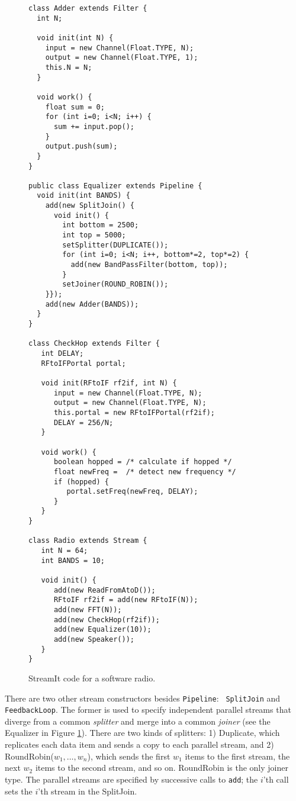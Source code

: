 \documentclass{sig-alternate}
\begin{document}
\begin{figure}
\vspace{-6pt}
\caption{Block diagram of a software radio.
\protect\label{fig:radiodiagram}}

\scriptsize
\begin{verbatim}
class Adder extends Filter {
  int N;

  void init(int N) {
    input = new Channel(Float.TYPE, N);
    output = new Channel(Float.TYPE, 1);
    this.N = N;
  }
  
  void work() {
    float sum = 0;
    for (int i=0; i<N; i++) {
      sum += input.pop();
    }
    output.push(sum);
  }
}

public class Equalizer extends Pipeline {
  void init(int BANDS) {
    add(new SplitJoin() {
      void init() {
        int bottom = 2500;
        int top = 5000;
        setSplitter(DUPLICATE());
        for (int i=0; i<N; i++, bottom*=2, top*=2) {
          add(new BandPassFilter(bottom, top));
        }
        setJoiner(ROUND_ROBIN());
    }});
    add(new Adder(BANDS));
  }
}
  
class CheckHop extends Filter {
   int DELAY;
   RFtoIFPortal portal;

   void init(RFtoIF rf2if, int N) {
      input = new Channel(Float.TYPE, N);
      output = new Channel(Float.TYPE, N);
      this.portal = new RFtoIFPortal(rf2if);
      DELAY = 256/N;
   }

   void work() {
      boolean hopped = /* calculate if hopped */
      float newFreq =  /* detect new frequency */
      if (hopped) {
         portal.setFreq(newFreq, DELAY);
      }
   }
}

class Radio extends Stream {
   int N = 64;
   int BANDS = 10;

   void init() {
      add(new ReadFromAtoD());
      RFtoIF rf2if = add(new RFtoIF(N));
      add(new FFT(N));
      add(new CheckHop(rf2if));
      add(new Equalizer(10));
      add(new Speaker());
   }
}
\end{verbatim}
\vspace{-16pt}
\caption{StreamIt code for a software radio.
\protect\label{fig:radiocode}}
\end{figure}

There are two other stream constructors besides {\tt Pipeline}: {\tt
SplitJoin} and {\tt FeedbackLoop}.  The former is used to specify
independent parallel streams that diverge from a common {\it splitter}
and merge into a common {\it joiner} (see the Equalizer in Figure
\ref{fig:radiocode}).  There are two kinds of splitters: 1) Duplicate,
which replicates each data item and sends a copy to each parallel
stream, and 2) RoundRobin($w_1, \dots, w_n$), which sends the first
$w_1$ items to the first stream, the next $w_2$ items to the second
stream, and so on.  RoundRobin is the only joiner type.  The parallel
streams are specified by successive calls to {\tt add}; the $i$'th
call sets the $i$'th stream in the SplitJoin.
\end{document}
